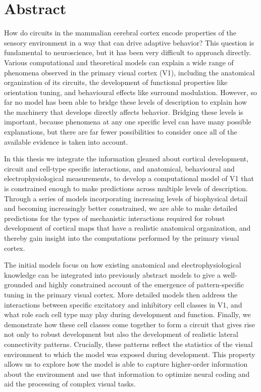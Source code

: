
\begingroup
\let\clearpage\relax
\let\cleardoublepage\relax
\let\cleardoublepage\relax

\chapter*{Abstract} %
How do circuits in the mammalian cerebral cortex encode properties of
the sensory environment in a way that can drive adaptive behavior?
This question is fundamental to neuroscience, but it has been very
difficult to approach directly. Various computational and theoretical
models can explain a wide range of phenomena observed in the primary
visual cortex (V1), including the anatomical organization of its
circuits, the development of functional properties like orientation
tuning, and behavioural effects like surround modulation. However, so
far no model has been able to bridge these levels of description to
explain how the machinery that develops directly affects
behavior. Bridging these levels is important, because phenomena at any
one specific level can have many possible explanations, but there are
far fewer possibilities to consider once all of the available evidence
is taken into account.

In this thesis we integrate the information gleaned about cortical
development, circuit and cell-type specific interactions, and
anatomical, behavioural and electrophysiological measurements, to
develop a computational model of V1 that is constrained enough to make
predictions across multiple levels of description. Through a series of
models incorporating increasing levels of biophysical detail and
becoming increasingly better constrained, we are able to make detailed
predictions for the types of mechanistic interactions required for
robust development of cortical maps that have a realistic anatomical
organization, and thereby gain insight into the computations performed
by the primary visual cortex.

The initial models focus on how existing anatomical and
electrophysiological knowledge can be integrated into previously
abstract models to give a well-grounded and highly constrained account
of the emergence of pattern-specific tuning in the primary visual
cortex. More detailed models then address the interactions between
specific excitatory and inhibitory cell classes in V1, and what role
each cell type may play during development and function. Finally, we
demonstrate how these cell classes come together to form a circuit
that gives rise not only to robust development but also the
development of realistic lateral connectivity patterns.  Crucially,
these patterns reflect the statistics of the visual environment to
which the model was exposed during development. This property allows
us to explore how the model is able to capture higher-order
information about the environment and use that information to optimize
neural coding and aid the processing of complex visual tasks.


